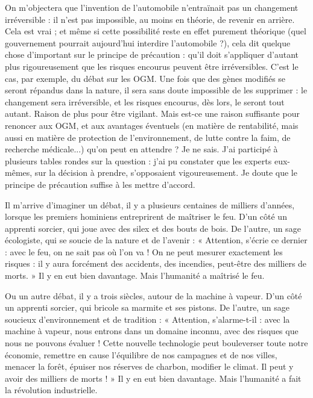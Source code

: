 On m’objectera que l'invention de l’automobile n’entraïnait pas un changement
irréversible : il n’est pas impossible, au moins en théorie, de revenir en
arrière. Cela est vrai ; et même si cette possibilité reste en effet purement théorique
(quel gouvernement pourrait aujourd’hui interdire l'automobile ?), cela
dit quelque chose d’important sur le principe de précaution : qu’il doit s’appliquer
d’autant plus rigoureusement que les risques encourus peuvent être irréversibles.
C’est le cas, par exemple, du débat sur les OGM. Une fois que des
gènes modifiés se seront répandus dans la nature, il sera sans doute impossible
de les supprimer : le changement sera irréversible, et les risques encourus, dès
lors, le seront tout autant. Raison de plus pour être vigilant. Mais est-ce une
raison suffisante pour renoncer aux OGM, et aux avantages éventuels (en
matière de rentabilité, mais aussi en matière de protection de l’environnement,
de lutte contre la faim, de recherche médicale...) qu’on peut en attendre ? Je ne
sais. J'ai participé à plusieurs tables rondes sur la question : j’ai pu constater que
les experts eux-mêmes, sur la décision à prendre, s’opposaient vigoureusement.
Je doute que le principe de précaution suffise à les mettre d’accord.

Il m'arrive d'imaginer un débat, il y a plusieurs centaines de milliers
d'années, lorsque les premiers hominiens entreprirent de maîtriser le feu. D’un
côté un apprenti sorcier, qui joue avec des silex et des bouts de bois. De l’autre,
un sage écologiste, qui se soucie de la nature et de l’avenir : « Attention, s’écrie
ce dernier : avec le feu, on ne sait pas où l’on va ! On ne peut mesurer exactement
les risques : il y aura forcément des accidents, des incendies, peut-être des
milliers de morts. » Il y en eut bien davantage. Mais l’humanité a maîtrisé le
feu.

Ou un autre débat, il y a trois siècles, autour de la machine à vapeur. D’un
côté un apprenti sorcier, qui bricole sa marmite et ses pistons. De l’autre, un
sage soucieux d'environnement et de tradition : « Attention, s’alarme-t-il : avec
la machine à vapeur, nous entrons dans un domaine inconnu, avec des risques
que nous ne pouvons évaluer ! Cette nouvelle technologie peut bouleverser
toute notre économie, remettre en cause l'équilibre de nos campagnes et de nos
villes, menacer la forêt, épuiser nos réserves de charbon, modifier le climat. Il
peut y avoir des milliers de morts ! » Il y en eut bien davantage. Mais l’humanité
a fait la révolution industrielle.

